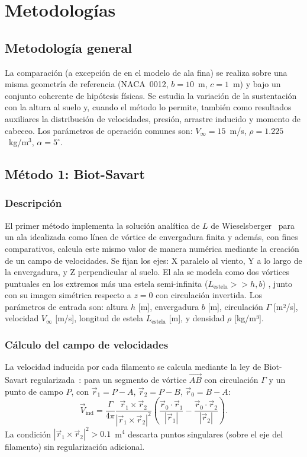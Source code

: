 \documentclass[twocolumn]{article}
\begin{document}
\section{Metodologías}

\subsection{Metodología general}
La comparación (a excepción de en el modelo de ala fina) se realiza sobre una misma geometría de referencia (NACA~0012, $b = 10$~m, $c = 1$~m) y bajo un conjunto coherente de hipótesis físicas. Se estudia la variación de la sustentación con la altura al suelo y, cuando el método lo permite, también como resultados auxiliares la distribución de velocidades, presión, arrastre inducido y momento de cabeceo. Los parámetros de operación comunes son: $V_\infty = 15$~m/s,
$\rho = 1.225$~kg/m$^3$, $\alpha = 5^\circ$.

\subsection{Método 1: Biot-Savart}

\subsubsection{Descripción}

El primer método implementa la solución analítica de $L$ de Wieselsberger~\cite{wieselsberger1922} para un ala idealizada como línea de vórtice de envergadura finita y además, con fines comparativos, calcula este mismo valor de manera numérica mediante la creación de un campo de velocidades. Se fijan los ejes: X paralelo al viento, Y a lo largo de la envergadura, y Z perpendicular al suelo. El ala se modela como dos vórtices puntuales en los extremos más una estela semi-infinita ($L_{\text{estela}}>>h,b$) , junto con su imagen simétrica respecto a $z = 0$ con circulación invertida. Los parámetros de entrada son: altura $h$ [m], envergadura $b$ [m], circulación $\Gamma$ [m²/s], velocidad $V_\infty$ [m/s], longitud de estela $L_{\text{estela}}$ [m], y densidad $\rho$ [kg/m³].

\subsubsection{Cálculo del campo de velocidades}

La velocidad inducida por cada filamento se calcula mediante la ley de
Biot-Savart regularizada~\cite{katz2001}: para un segmento de vórtice
$\overrightarrow{AB}$ con circulación $\Gamma$ y un punto de campo $P$,
con $\vec{r}_1 = P - A$, $\vec{r}_2 = P - B$, $\vec{r}_0 = B - A$:
\begin{equation}
  \vec{V}_\text{ind} = \frac{\Gamma}{4\pi}
  \frac{\vec{r}_1 \times \vec{r}_2}{|\vec{r}_1 \times \vec{r}_2|^2}
  \left(
    \frac{\vec{r}_0 \cdot \vec{r}_1}{|\vec{r}_1|} -
    \frac{\vec{r}_0 \cdot \vec{r}_2}{|\vec{r}_2|}
  \right).
  \label{eq:biot_savart}
\end{equation}
La condición $|\vec{r}_1 \times \vec{r}_2|^2 > 0.1$~m$^4$ descarta
puntos singulares (sobre el eje del filamento) sin regularización
adicional.
\end{document}
